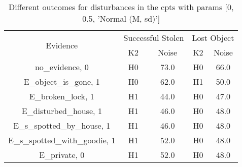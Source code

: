 \begin{table}\begin{tabular}{c|cc|cc}\toprule\multirow{2}{*}{Evidence} & \multicolumn{2}{c}{Successful Stolen} & \multicolumn{2}{c}{Lost Object} \\& {K2} & {Noise} & {K2} & {Noise} \\\midrule
no\_evidence, 0 & \cellcolor{Bittersweet}H0&\cellcolor{Bittersweet}73.0&\cellcolor{Bittersweet}H0&\cellcolor{Bittersweet}66.0\\E\_object\_is\_gone, 1 & \cellcolor{Bittersweet}H0&\cellcolor{Bittersweet}62.0&\cellcolor{Bittersweet}H1&\cellcolor{Bittersweet}50.0\\E\_broken\_lock, 1 & \cellcolor{Bittersweet}H1&\cellcolor{Bittersweet}44.0&\cellcolor{Bittersweet}H0&\cellcolor{Bittersweet}47.0\\E\_disturbed\_house, 1 & \cellcolor{Bittersweet}H1&\cellcolor{Bittersweet}46.0&\cellcolor{Bittersweet}H0&\cellcolor{Bittersweet}48.0\\E\_s\_spotted\_by\_house, 1 & \cellcolor{Bittersweet}H1&\cellcolor{Bittersweet}46.0&\cellcolor{Bittersweet}H0&\cellcolor{Bittersweet}48.0\\E\_s\_spotted\_with\_goodie, 1 & \cellcolor{Bittersweet}H1&\cellcolor{Bittersweet}52.0&\cellcolor{Bittersweet}H0&\cellcolor{Bittersweet}48.0\\E\_private, 0 & \cellcolor{Bittersweet}H1&\cellcolor{Bittersweet}52.0&\cellcolor{Bittersweet}H0&\cellcolor{Bittersweet}48.0\\\bottomrule\end{tabular}\caption{Different outcomes for disturbances in the cpts with params [0, 0.5, 'Normal (M, sd)']}\end{table}